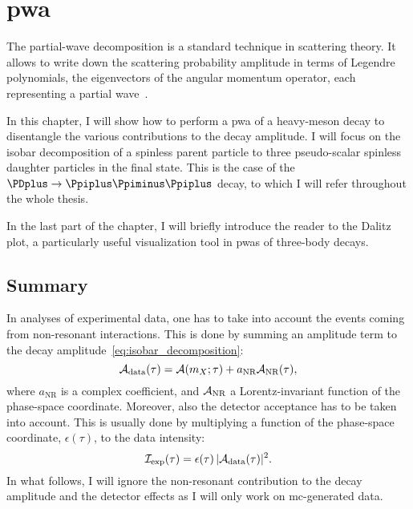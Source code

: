\chapter{\texorpdfstring{\Acl{pwa}}{Partial-wave analysis}}
\label{chap:theory}

    The partial-wave decomposition is a standard technique in scattering theory.
    It allows to write down the scattering probability amplitude in terms of Legendre polynomials, the eigenvectors of the angular momentum operator, each representing a partial wave~\cite[\S~11.2]{griffiths_intro_qm}.


    In this chapter, I will show how to perform a \ac{pwa} of a heavy-meson decay to disentangle the various contributions to the decay amplitude.
    I will focus on the isobar decomposition of a spinless parent particle to three pseudo-scalar spinless daughter particles in the final state.
    This is the case of the $\PDplus\to\Ppiplus\Ppiminus\Ppiplus$ decay, to which I will refer throughout the whole thesis.


    In the last part of the chapter, I will briefly introduce the reader to the Dalitz plot, a particularly useful visualization tool in \acp{pwa} of three-body decays.

    
    

    \section{Summary}

    In analyses of experimental data, one has to take into account the events coming from non-resonant interactions.
    This is done by summing an amplitude term to the decay amplitude~\eqref{eq:isobar_decomposition}:
    \begin{equation}
        \mathcal{A}_{\text{data}}(\tau) = \mathcal{A}(m_X;\tau) + a_{\text{NR}} \mathcal{A}_{\text{NR}}(\tau),
    \end{equation}
    where $a_{\text{NR}}$ is a complex coefficient, and $\mathcal{A}_{\text{NR}}$ a Lorentz-invariant function of the phase-space coordinate.
    Moreover, also the detector acceptance has to be taken into account.
    This is usually done by multiplying a function of the phase-space coordinate, $\epsilon(\tau)$, to the data intensity:
    \begin{equation}
        \mathcal{I}_{\text{exp}}(\tau) = \epsilon(\tau)\,\lvert\mathcal{A}_{\text{data}}(\tau)\rvert^2.
    \end{equation}
    In what follows, I will ignore the non-resonant contribution to the decay amplitude and the detector effects as I will only work on \ac{mc}-generated data.



